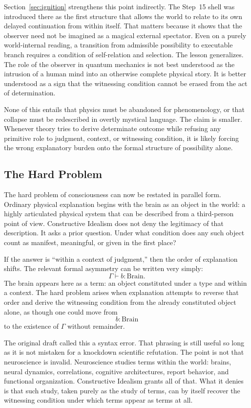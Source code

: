 \documentclass[11pt,a4paper]{article}
\theoremstyle{plain}
\theoremstyle{definition}
\theoremstyle{remark}
\begin{document}
Section~\ref{sec:ignition} strengthens this point indirectly.
The Step~15 shell was introduced there as the first structure that allows the world to relate to its own delayed continuation from within itself.
That matters because it shows that the observer need not be imagined as a magical external spectator.
Even on a purely world-internal reading, a transition from admissible possibility to executable branch requires a condition of self-relation and selection.
The lesson generalizes.
The role of the observer in quantum mechanics is not best understood as the intrusion of a human mind into an otherwise complete physical story.
It is better understood as a sign that the witnessing condition cannot be erased from the act of determination.

None of this entails that physics must be abandoned for phenomenology, or that collapse must be redescribed in overtly mystical language.
The claim is smaller.
Whenever theory tries to derive determinate outcome while refusing any primitive role to judgment, context, or witnessing condition, it is likely forcing the wrong explanatory burden onto the formal structure of possibility alone.

\subsection{The Hard Problem}
\label{subsec:hard-problem}

The hard problem of consciousness can now be restated in parallel form.
Ordinary physical explanation begins with the brain as an object in the world: a highly articulated physical system that can be described from a third-person point of view.
Constructive Idealism does not deny the legitimacy of that description.
It asks a prior question.
Under what condition does any such object count as manifest, meaningful, or given in the first place?

If the answer is ``within a context of judgment,'' then the order of explanation shifts.
The relevant formal asymmetry can be written very simply:
\[
    \Gamma \vdash b : \mathrm{Brain}.
\]
The brain appears here as a term: an object constituted under a type and within a context.
The hard problem arises when explanation attempts to reverse that order and derive the witnessing condition from the already constituted object alone, as though one could move from
\[
    b : \mathrm{Brain}
\]
to the existence of $\Gamma$ without remainder.

The original draft called this a syntax error.
That phrasing is still useful so long as it is not mistaken for a knockdown scientific refutation.
The point is not that neuroscience is invalid.
Neuroscience studies terms within the world: brains, neural dynamics, correlations, cognitive architectures, report behavior, and functional organization.
Constructive Idealism grants all of that.
What it denies is that such study, taken purely as the study of terms, can by itself recover the witnessing condition under which terms appear as terms at all.
\end{document}
